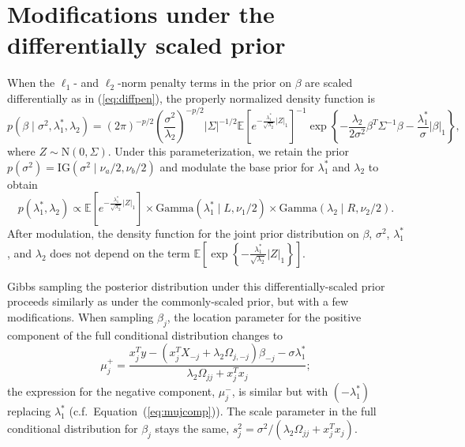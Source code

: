 \documentclass[12pt]{article}
\begin{document}
\section{Modifications under the differentially scaled prior}\label{app:diffpar}
When the $\ell_1$- and $\ell_2$-norm penalty terms in the prior on $\beta$ are scaled differentially as in
(\ref{eq:diffpen}), the properly normalized density function is
\[
	p(\beta \mid \sigma^2, \lambda_1^*, \lambda_2) = (2\pi)^{-p/2} \left(\frac{\sigma^2}{\lambda_2}\right)^{-p/2} 
		|\Sigma|^{-1/2} \mathbb{E}\left[ e^{-\frac{\lambda^*_1}{\sqrt{\lambda_2}} |Z|_1} \right]^{-1}
		\exp\left\{ -\frac{\lambda_2}{2\sigma^2} \beta^T \Sigma^{-1} \beta - \frac{\lambda_1^*}{\sigma}
		|\beta|_1 \right\},
\]
where $Z \sim \mbox{N}\left( 0, \Sigma\right)$. Under this parameterization, we retain the prior
$p(\sigma^2) = \mbox{IG}(\sigma^2 \mid \nu_a/2, \nu_b/2)$ and modulate the base prior for $\lambda_1^*$
and $\lambda_2$ to obtain
\[
	p(\lambda_1^*, \lambda_2) \propto \mathbb{E}\left[ e^{-\frac{\lambda^*_1}{\sqrt{\lambda_2}} |Z|_1} \right]
			\times \mbox{Gamma}(\lambda_1^* \mid L, \nu_1/2) \times \mbox{Gamma}(\lambda_2 \mid R, \nu_2/2).
\]
After modulation, the density function for the joint prior distribution on $\beta$, $\sigma^2$, $\lambda_1^*$, 
and $\lambda_2$ does not depend on the term $\mathbb{E}\left[ \exp\left\{-\frac{\lambda^*_1}{\sqrt{\lambda_2}} 
|Z|_1\right\} \right]$. 

Gibbs sampling the posterior distribution under this differentially-scaled prior proceeds similarly as under
the commonly-scaled prior, but with a few modifications. When sampling $\beta_j$,
the location parameter for the positive component of the full conditional distribution changes to
\[
	\mu_j^+ = \frac{x_j^T y - (x_j^T X_{-j} + \lambda_2 \Omega_{j,-j})\beta_{-j} - \sigma \lambda_1^*}
		{\lambda_2 \Omega_{jj} + x_j^T x_j};
\]
the expression for the negative component, $\mu_j^-$, is similar but with $(-\lambda^*_1)$ replacing
$\lambda_1^*$ (c.f.~Equation~(\ref{eq:mujcomp})). The scale parameter in the full conditional distribution
for $\beta_j$ stays the same, $s^2_j = \sigma^2/(\lambda_2 \Omega_{jj} + x_j^T x_j)$.
\end{document}
